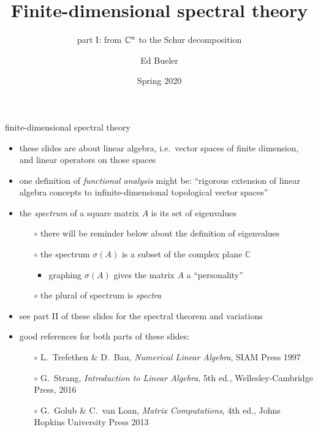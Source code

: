 \documentclass[10pt,hyperref]{beamer}
\title{Finite-dimensional spectral theory}
\subtitle{part I: from $\CC^n$ to the Schur decomposition}
\author{Ed Bueler}
\institute[MATH 617]{MATH 617 Functional Analysis}
\date{Spring 2020}
\newcommand{\CC}{\mathbb{C}}
\begin{document}
\beamertemplatenavigationsymbolsempty

\begin{frame}
  \maketitle
\end{frame}


\begin{frame}{finite-dimensional spectral theory}

\begin{itemize}
\item these slides are about linear algebra, i.e.~vector spaces of finite dimension, and linear operators on those spaces
\item one definition of \emph{functional analysis} might be: ``rigorous extension of linear algebra concepts to infinite-dimensional topological vector spaces''
\item the \emph{spectrum} of a square matrix $A$ is its set of eigenvalues
    \begin{itemize}
    \item[$\circ$] there will be reminder below about the definition of eigenvalues
    \item[$\circ$] the spectrum $\sigma(A)$ is a subset of the complex plane $\CC$
        \begin{itemize}
        \item graphing $\sigma(A)$ gives the matrix $A$ a ``personality''
        \end{itemize}
    \item[$\circ$] the plural of spectrum is \emph{spectra}
    \end{itemize}
\item see part II of these slides for the spectral theorem and variations
\item good references for both parts of these slides:
    \begin{itemize}
    \item[$\circ$] L.~Trefethen \& D.~Bau, \emph{Numerical Linear Algebra}, SIAM Press 1997
    \item[$\circ$] G.~Strang, \emph{Introduction to Linear Algebra}, 5th ed., Wellesley-Cambridge Press, 2016
    \item[$\circ$] G.~Golub \& C.~van Loan, \emph{Matrix Computations}, 4th ed., Johns Hopkins University Press 2013
    \end{itemize}

\end{itemize}
\end{frame}
\end{document}
